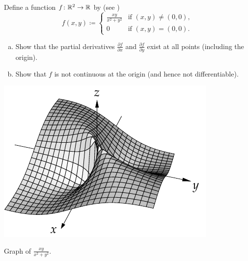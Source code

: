 \begin{exercise} \label{exercise:noncontpartialsexist}
Define a function $f \colon {\mathbb{R}}^2 \to {\mathbb{R}}$ by
(see )
\begin{equation*}
f(x,y)
\coloneqq
\begin{cases}
\frac{xy}{x^2+y^2} & \text{if } (x,y) \not= (0,0), \\
0                  & \text{if } (x,y) = (0,0).
\end{cases}
\end{equation*}
\begin{enumerate}[a)]
\item
Show that the partial derivatives 
$\frac{\partial f}{\partial x}$ and
$\frac{\partial f}{\partial y}$ exist at all points (including the origin).
\item
Show that $f$ is not continuous at the origin (and hence not
differentiable).
\end{enumerate}
\end{exercise}

\begin{myfigureht}
\includegraphics{figures/xyxsqysq}
\caption{Graph of $\frac{xy}{x^2+y^2}$.\label{fig:xyxsqysqvol2}}
\end{myfigureht}

